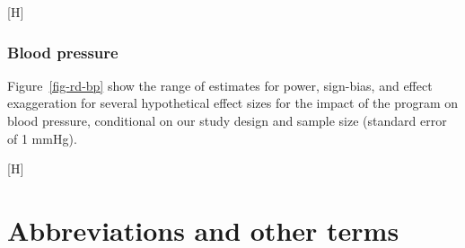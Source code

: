 \documentclass[
  letterpaper,
  DIV=11,
  numbers=noendperiod]{scrartcl}
\makeatletter
\renewenvironment{table}%
   {\renewcommand\familydefault\sfdefault
    \@float{table}}
   {\end@float}
\renewenvironment{figure}%
   {\renewcommand\familydefault\sfdefault
    \@float{figure}}
   {\end@float}
\makeatother
\begin{document}
\begin{table}[H]
{}

\end{table}%

\newpage

\subsubsection{Blood pressure}\label{blood-pressure-2}

Figure~\ref{fig-rd-bp} show the range of estimates for power, sign-bias,
and effect exaggeration for several hypothetical effect sizes for the
impact of the program on blood pressure, conditional on our study design
and sample size (standard error of 1 mmHg).

\begin{figure}[H]

\caption{\label{fig-rd-bp}Power, sign-bias, and exaggeration ratios for
various hypothetical effects of the policy on blood pressure, given our
study design.}


\end{figure}%

\newpage

\section*{Abbreviations and other
terms}\label{abbreviations-and-other-terms}
\end{document}
